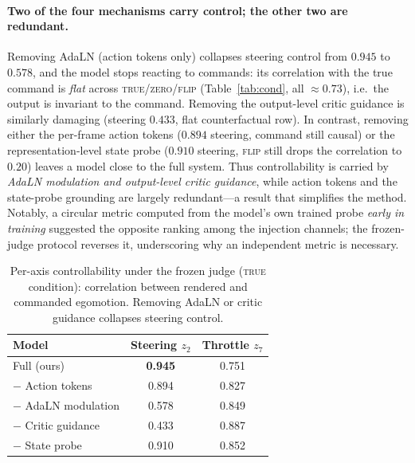 \documentclass[letterpaper]{article} %
\begin{document}
\paragraph{Two of the four mechanisms carry control; the other two are redundant.} Removing AdaLN (action tokens only) collapses steering control from $0.945$ to $0.578$, and the model stops reacting to commands: its correlation with the true command is \emph{flat} across \textsc{true}/\textsc{zero}/\textsc{flip} (Table~\ref{tab:cond}, all $\approx0.73$), i.e.\ the output is invariant to the command. Removing the output-level critic guidance is similarly damaging (steering $0.433$, flat counterfactual row). In contrast, removing either the per-frame action tokens ($0.894$ steering, command still causal) or the representation-level state probe ($0.910$ steering, \textsc{flip} still drops the correlation to $0.20$) leaves a model close to the full system. Thus controllability is carried by \emph{AdaLN modulation and output-level critic guidance}, while action tokens and the state-probe grounding are largely redundant---a result that simplifies the method. Notably, a circular metric computed from the model's own trained probe \emph{early in training} suggested the opposite ranking among the injection channels; the frozen-judge protocol reverses it, underscoring why an independent metric is necessary.

\begin{table}[t]
\centering
\begin{tabular}{lcc}
\toprule
Model & Steering $z_2$ & Throttle $z_7$ \\
\midrule
Full (ours)            & \textbf{0.945} & 0.751 \\
$-$ Action tokens      & 0.894 & 0.827 \\
$-$ AdaLN modulation   & 0.578 & 0.849 \\
$-$ Critic guidance    & 0.433 & 0.887 \\
$-$ State probe        & 0.910 & 0.852 \\
\bottomrule
\end{tabular}
\caption{Per-axis controllability under the frozen judge (\textsc{true} condition): correlation between rendered and commanded egomotion. Removing AdaLN or critic guidance collapses steering control.}
\label{tab:ablation}
\end{table}
\end{document}
